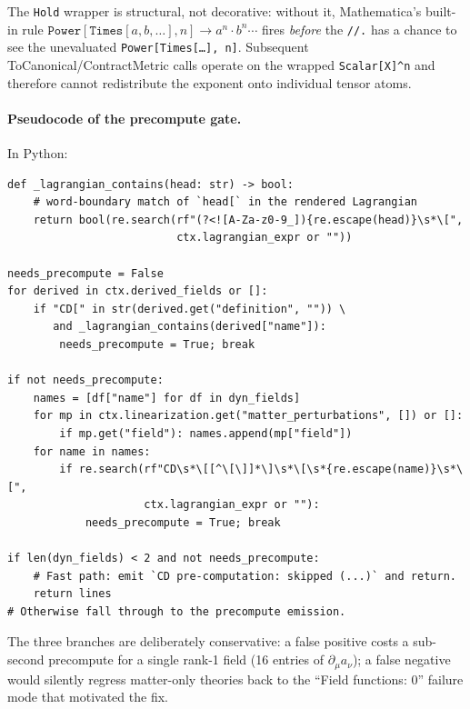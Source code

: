 The \texttt{Hold} wrapper is structural, not decorative: without it, Mathematica's built-in rule $\texttt{Power}[\texttt{Times}[a,b,\dots], n] \rightarrow a^n \cdot b^n \cdots$ fires \emph{before} the \texttt{//.} has a chance to see the unevaluated \texttt{Power[Times[\dots], n]}. Subsequent ToCanonical/ContractMetric calls operate on the wrapped \texttt{Scalar[X]\textasciicircum n} and therefore cannot redistribute the exponent onto individual tensor atoms.

\paragraph{Pseudocode of the precompute gate.} In Python:
\begin{verbatim}
def _lagrangian_contains(head: str) -> bool:
    # word-boundary match of `head[` in the rendered Lagrangian
    return bool(re.search(rf"(?<![A-Za-z0-9_]){re.escape(head)}\s*\[",
                          ctx.lagrangian_expr or ""))

needs_precompute = False
for derived in ctx.derived_fields or []:
    if "CD[" in str(derived.get("definition", "")) \
       and _lagrangian_contains(derived["name"]):
        needs_precompute = True; break

if not needs_precompute:
    names = [df["name"] for df in dyn_fields]
    for mp in ctx.linearization.get("matter_perturbations", []) or []:
        if mp.get("field"): names.append(mp["field"])
    for name in names:
        if re.search(rf"CD\s*\[[^\[\]]*\]\s*\[\s*{re.escape(name)}\s*\[",
                     ctx.lagrangian_expr or ""):
            needs_precompute = True; break

if len(dyn_fields) < 2 and not needs_precompute:
    # Fast path: emit `CD pre-computation: skipped (...)` and return.
    return lines
# Otherwise fall through to the precompute emission.
\end{verbatim}

The three branches are deliberately conservative: a false positive costs a sub-second precompute for a single rank-1 field (16 entries of $\partial_{\mu} a_{\nu}$); a false negative would silently regress matter-only theories back to the ``Field functions: 0'' failure mode that motivated the fix.

